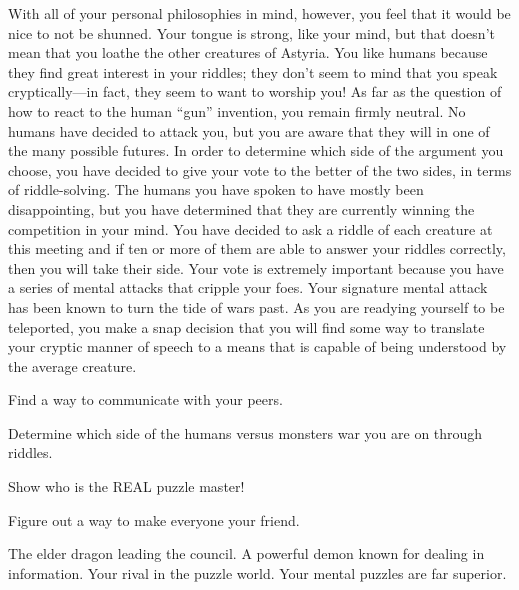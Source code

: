 \documentclass[char]{guildcamp2}
\begin{document}
With all of your personal philosophies in mind, however, you feel that it would be nice to not be shunned. Your tongue is strong, like your mind, but that doesn't mean that you loathe the other creatures of Astyria. You like humans because they find great interest in your riddles; they don't seem to mind that you speak cryptically---in fact, they seem to want to worship you! As far as the question of how to react to the human ``gun'' invention, you remain firmly neutral. No humans have decided to attack you, but you are aware that they will in one of the many possible futures. In order to determine which side of the argument you choose, you have decided to give your vote to the better of the two sides, in terms of riddle-solving. The humans you have spoken to have mostly been disappointing, but you have determined that they are currently winning the competition in your mind. You have decided to ask a riddle of each creature at this meeting and if ten or more of them are able to answer your riddles correctly, then you will take their side. Your vote is extremely important because you have a series of mental attacks that cripple your foes. Your signature mental attack has been known to turn the tide of wars past. As you are readying yourself to be teleported, you make a snap decision that you will find some way to translate your cryptic manner of speech to a means that is capable of being understood by the average creature. 


\begin{itemz}[Goals]
  \item Find a way to communicate with your peers.
  \item Determine which side of the humans versus monsters war you are on through riddles.
  \item Show \cMinotaur{} who is the REAL puzzle master!
  \item Figure out a way to make everyone your friend.
 
\end{itemz}

\begin{contacts}
  \contact{\cOnyx{}} The elder dragon leading the council.
  \contact{\cDemon{}} A powerful demon known for dealing in information.
  \contact{\cMinotaur{}} Your rival in the puzzle world. Your mental puzzles are far superior. 
\end{contacts}
\end{document}
